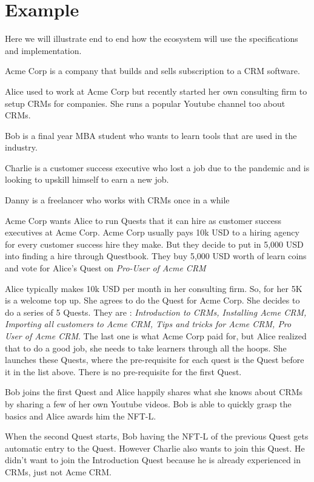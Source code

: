 \documentclass{article}
\begin{document}
  \section{Example}
    Here we will illustrate end to end how the ecosystem will use the specifications and implementation.
    \par
    Acme Corp is a company that builds and sells subscription to a CRM software.
    \par
    Alice used to work at Acme Corp but recently started her own consulting firm to setup CRMs for companies. She runs a popular Youtube channel too about CRMs.
    \par
    Bob is a final year MBA student who wants to learn tools that are used in the industry.
    \par
    Charlie is a customer success executive who lost a job due to the pandemic and is looking to upskill himself to earn a new job.
    \par
    Danny is a freelancer who works with CRMs once in a while
    \par
    Acme Corp wants Alice to run Quests that it can hire as customer success executives at Acme Corp.
    Acme Corp usually pays 10k USD to a hiring agency for every customer success hire they make. But they decide to put in 5,000 USD into finding a hire through Questbook. They buy 5,000 USD worth of learn coins and vote for Alice's Quest on \textit{Pro-User of Acme CRM}
    \par
    Alice typically makes 10k USD per month in her consulting firm. So, for her 5K is a welcome top up. She agrees to do the Quest for Acme Corp. She decides to do a series of 5 Quests.
    They are : \textit{Introduction to CRMs, Installing Acme CRM, Importing all customers to Acme CRM, Tips and tricks for Acme CRM, Pro User of Acme CRM}.
    The last one is what Acme Corp paid for, but Alice realized that to do a good job, she needs to take learners through all the hoops. She launches these Quests, where the pre-requisite for each quest is the Quest before it in the list above.
    There is no pre-requisite for the first Quest.
    \par
    Bob joins the first Quest and Alice happily shares what she knows about CRMs by sharing a few of her own Youtube videos. Bob is able to quickly grasp the basics and Alice awards him the NFT-L.
    \par
    When the second Quest starts, Bob having the NFT-L of the previous Quest gets automatic entry to the Quest.
    However Charlie also wants to join this Quest. He didn't want to join the Introduction Quest because he is already experienced in CRMs, just not Acme CRM.
\end{document}

